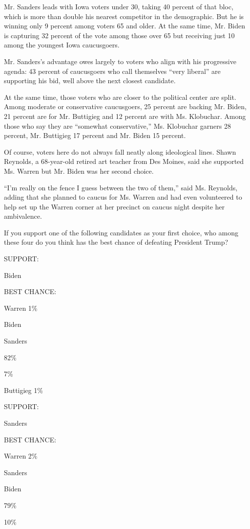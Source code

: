 Mr. Sanders leads with Iowa voters under 30, taking 40 percent of that
bloc, which is more than double his nearest competitor in the
demographic. But he is winning only 9 percent among voters 65 and older.
At the same time, Mr. Biden is capturing 32 percent of the vote among
those over 65 but receiving just 10 among the youngest Iowa caucusgoers.

Mr. Sanders's advantage owes largely to voters who align with his
progressive agenda: 43 percent of caucusgoers who call themselves ``very
liberal'' are supporting his bid, well above the next closest candidate.

At the same time, those voters who are closer to the political center
are split. Among moderate or conservative caucusgoers, 25 percent are
backing Mr. Biden, 21 percent are for Mr. Buttigieg and 12 percent are
with Ms. Klobuchar. Among those who say they are ``somewhat
conservative,'' Ms. Klobuchar garners 28 percent, Mr. Buttigieg 17
percent and Mr. Biden 15 percent.

Of course, voters here do not always fall neatly along ideological
lines. Shawn Reynolds, a 68-year-old retired art teacher from Des
Moines, said she supported Ms. Warren but Mr. Biden was her second
choice.

``I'm really on the fence I guess between the two of them,'' said Ms.
Reynolds, adding that she planned to caucus for Ms. Warren and had even
volunteered to help set up the Warren corner at her precinct on caucus
night despite her ambivalence.

If you support one of the following candidates as your first choice, who
among these four do you think has the best chance of defeating President
Trump?

SUPPORT:

Biden

BEST CHANCE:

Warren 1\%

Biden

Sanders

82\%

7\%

Buttigieg 1\%

SUPPORT:

Sanders

BEST CHANCE:

Warren 2\%

Sanders

Biden

79\%

10\%

